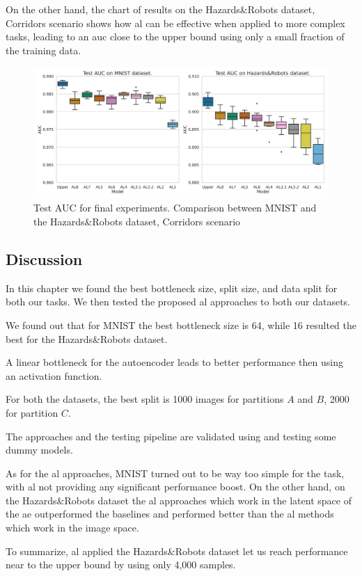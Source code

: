             On the other hand, the chart of results on the Hazards\&Robots dataset, Corridors scenario shows how \acrshort{al} can be effective when applied to more complex tasks, leading to an \acrshort{auc} close to the upper bound using only a small fraction of the training data.
            \begin{figure}[H]
                \centering
                \centerline{\includegraphics[width=\textwidth]{img/results/final_comparison.png}}
                \caption{Test AUC for final experiments. Comparison between MNIST and the Hazards\&Robots dataset, Corridors scenario}
                \label{fig:comparison}
            \end{figure}
            
        \subsection{Discussion}
        In this chapter we found the best bottleneck size, split size, and data split for both our tasks. We then tested the proposed \acrshort{al} approaches to both our datasets.
        
        
        \noindent We found out that for MNIST the best bottleneck size is 64, while 16 resulted the best for the Hazards\&Robots dataset.
        
        
        \noindent A linear bottleneck for the autoencoder leads to better performance then using an activation function.
        
        
        \noindent For both the datasets, the best split is 1000 images for partitions $A$ and $B$, 2000 for partition $C$.
        
        \noindent The approaches and the testing pipeline are validated using and testing some dummy models.
        
        \noindent As for the \acrshort{al} approaches, MNIST turned out to be way too simple for the task, with \acrshort{al} not providing any significant performance boost. On the other hand, on the Hazards\&Robots dataset the \acrshort{al} approaches which work in the latent space of the \acrshort{ae} outperformed the baselines and performed better than the \acrshort{al} methods which work in the image space.
        
        \noindent To summarize, \acrshort{al} applied the Hazards\&Robots dataset let us reach performance near to the upper bound by using only 4,000 samples.
        
        